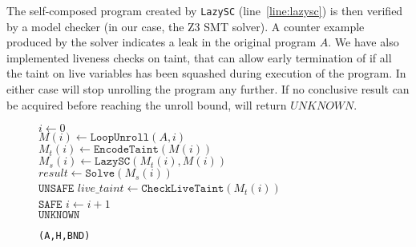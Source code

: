 The self-composed program created by \texttt{LazySC} (line~\ref{line:lazysc}) is then verified by a model checker (in our case, the Z3 SMT solver). A counter example produced by the solver indicates a leak in the original program $A$. We have also implemented  liveness checks on taint, that can allow early termination of \Bmc if all the taint on live variables has been squashed during execution of the program. In either case \Bmc will stop unrolling the program any further. If no conclusive result can be acquired before reaching the unroll bound, \Bmc will return $UNKNOWN$.

\begin{figure}[!t]
  \begin{algorithm2e}[H]
  \DontPrintSemicolon
  \SetAlgoVlined
  \LinesNumbered
   

  $i \gets 0$\\
   {\label{line:bmc-loop}
  	 $M(i) \gets \texttt{LoopUnroll}(A, i)$ {\label{line:bmc-unroll}}\\
  	 $M_t(i) \gets \texttt{EncodeTaint}(M(i))$ {\label{line:bmc-taint}}\\
  	 $M_s(i) \gets \texttt{LazySC}(M_t(i), M(i))$ {\label{line:lazysc}}\\
  	 $result \gets \texttt{Solve}(M_s(i))$\\
      {
        \Return $\texttt{UNSAFE}$
     }
     $live\_taint \gets \texttt{CheckLiveTaint}(M_t(i))$\\
      {
      	\Return $\texttt{SAFE}$  
     }
     $i \gets i+1$\\
  }
  \Return $\texttt{UNKNOWN}$
  \caption{\texttt{\Bmc(A,H,BND)}}
  \label{alg:ifc-bmc}
  \end{algorithm2e}
\end{figure}



\begin{comment}
\subsection{Dynamic Taint Propagation}

\subsection{Lazy Duplication}

\subsection{Early Termination}

\subsection{Interpolant-based Verification}
\end{comment}